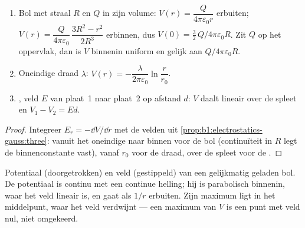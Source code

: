 \begin{proposition}\label{prop:b1:potential-capacitors:classic}
\begin{enumerate}
  \item Bol met straal $R$ en $Q$ in zijn volume: $V(r) = \dfrac{Q}{4\pi\varepsilon_0r}$
        erbuiten; $V(r) = \dfrac{Q}{4\pi\varepsilon_0}\,\dfrac{3R^2 - r^2}{2R^3}$
        erbinnen, dus $V(0) = \tfrac32\,Q/4\pi\varepsilon_0R$. Zit $Q$ op het oppervlak,
        dan is $V$ binnenin uniform en gelijk aan $Q/4\pi\varepsilon_0R$.
  \item Oneindige draad $\lambda$: $V(r) = -\dfrac{\lambda}{2\pi\varepsilon_0}\ln\dfrac{r}{r_0}$.
  \item {}, veld $E$ van plaat~1 naar plaat~2 op afstand $d$:
        $V$ daalt lineair over de spleet en $V_1 - V_2 = Ed$.
\end{enumerate}
\end{proposition}

\begin{proof}
Integreer $E_r = -\dd V/\dd r$ met de velden uit
\cref{prop:b1:electrostatics-gauss:three}: vanuit het oneindige naar binnen voor de
bol (continuïteit in $R$ legt de binnenconstante vast), vanaf $r_0$ voor de
draad, over de spleet voor de .
\end{proof}

\begin{omfigure}

{\small Potentiaal (doorgetrokken) en veld (gestippeld) van een gelijkmatig geladen
bol. De potentiaal is continu met een continue helling; hij is
parabolisch binnenin, waar het veld lineair is, en gaat als $1/r$ erbuiten. Zijn
maximum ligt in het middelpunt, waar het veld verdwijnt --- een maximum van
$V$ is een punt met veld nul, niet omgekeerd.}
\end{omfigure}

